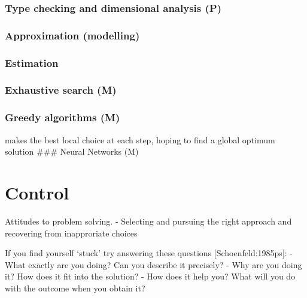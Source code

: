 \documentclass[
  a4paper,
  DIV=11,
  numbers=noendperiod,
  oneside]{scrreprt}
\begin{document}
\subsection{Type checking and dimensional analysis
(P)}\label{type-checking-and-dimensional-analysis-p}

\subsection{Approximation (modelling)}\label{approximation-modelling}

\subsection{Estimation}\label{estimation}

\subsection{Exhaustive search (M)}\label{exhaustive-search-m}

\subsection{Greedy algorithms (M)}\label{greedy-algorithms-m}

makes the best local choice at each step, hoping to find a global
optimum solution \#\#\# Neural Networks (M)

\chapter{Control}\label{sec-control}

Attitudes to problem solving. - Selecting and pursuing the right
approach and recovering from inapproriate choices

\begin{tcolorbox}[enhanced jigsaw, leftrule=.75mm, breakable, coltitle=black, titlerule=0mm, bottomtitle=1mm, arc=.35mm, rightrule=.15mm, opacitybacktitle=0.6, toptitle=1mm, toprule=.15mm, left=2mm, colframe=quarto-callout-important-color-frame, title=\textcolor{quarto-callout-important-color}{\faExclamation}\hspace{0.5em}{Important}, colback=white, colbacktitle=quarto-callout-important-color!10!white, bottomrule=.15mm, opacityback=0]

If you find yourself `stuck' try answering these questions
{[}Schoenfeld:1985ps{]}: - What exactly are you doing? Can you describe
it precisely? - Why are you doing it? How does it fit into the solution?
- How does it help you? What will you do with the outcome when you
obtain it?

\end{tcolorbox}
\end{document}
